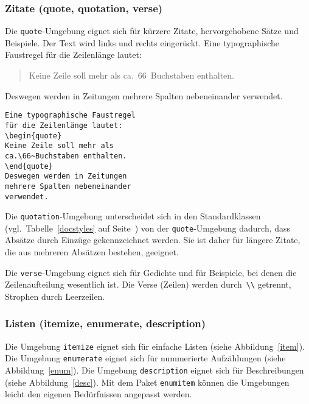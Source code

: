 \subsubsection{Zitate (quote, quotation, verse)}
 
Die \texttt{quote}-Umgebung eignet sich für kürzere Zitate,
hervorgehobene Sätze und Beispiele.
Der Text wird links und rechts eingerückt.
\exa
Eine typographische Faustregel
für die Zeilenlänge lautet:
\begin{quote}

Keine Zeile soll mehr als
ca.\ 66~Buchstaben enthalten.
\end{quote}
Deswegen werden in Zeitungen
mehrere Spalten nebeneinander
verwendet.
\exb 
\begin{verbatim}
Eine typographische Faustregel
für die Zeilenlänge lautet:
\begin{quote}
Keine Zeile soll mehr als
ca.\66~Buchstaben enthalten.
\end{quote}
Deswegen werden in Zeitungen
mehrere Spalten nebeneinander
verwendet.
\end{verbatim}
\exc

Die \texttt{quotation}-Umgebung unterscheidet sich in den
Standardklassen (vgl.\ Tabelle~\ref{docstyles} auf
Seite~\pageref{docstyles}) von der \texttt{quote}-Umgebung
dadurch, dass Absätze durch Einzüge gekennzeichnet werden.
Sie ist daher für längere Zitate, die aus mehreren Absätzen
bestehen, geeignet.

Die \texttt{verse}-Umgebung eignet sich für Gedichte und für
Beispiele, bei denen die Zeilenaufteilung wesentlich ist.  Die
Verse (Zeilen) werden durch~\lstinline|\\| getrennt, Strophen durch
Leerzeilen.


\subsubsection{Listen (itemize, enumerate, description)}
Die Umgebung \texttt{itemize} eignet sich für einfache Listen
(siehe Abbildung~\vref{item}).
Die Umgebung \texttt{enumerate} eignet sich für nummerierte
Aufzählungen (siehe Abbildung~\vref{enum}).
Die Umgebung \texttt{description} eignet sich für Beschreibungen
(siehe Abbildung~\vref{desc}). Mit dem Paket \texttt{enumitem} können die Umgebungen leicht den eigenen Bedürfnissen angepasst werden.

